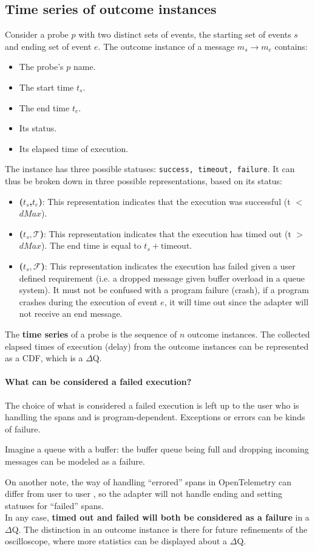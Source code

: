 \subsection{Time series of outcome instances}
    Consider a probe $p$ with two distinct sets of events, the starting set of events $s$ and ending set of event $e$. The outcome instance of a message $m_s \rightarrow m_e$ contains:
    \begin{itemize}
        \item The probe's $p$ name.
        \item The start time $t_s$.
        \item The end time $t_e$.
        \item Its status.
        \item Its elapsed time of execution.
    \end{itemize}
    The instance has three possible statuses: \texttt{success, timeout, failure}. It can thus be broken down in three possible representations, based on its status:
    \begin{itemize}
        \item \textbf{($t_s$,$t_e$)}: This representation indicates that the execution was successful (t $<$ $dMax$). 
        \item \textbf{($t_s, \mathcal{T}$)}: This representation indicates that the execution has timed out (t $>$ $dMax$). The end time is equal to $t_s + \text{timeout}$.
        \item \textbf{($t_s, \mathcal{F}$)}: This representation indicates the execution has failed given a user defined requirement (i.e. a dropped message given buffer overload in a queue system). It must not be confused with a program failure (crash), if a program crashes during the execution of event $e$, it will time out since the adapter will not receive an end message.
    \end{itemize}
    The \textbf{time series} of a probe is the sequence of $n$ outcome instances. The collected elapsed times of execution (delay) from the outcome instances can be represented as a CDF, which is a $\Delta$Q.

    \paragraph{What can be considered a failed execution?} The choice of what is considered a failed execution is left up to the user who is handling the spans and is program-dependent. Exceptions or errors can be kinds of failure.

    Imagine a queue with a buffer: the buffer queue being full and dropping incoming messages can be modeled as a failure.

    On another note, the way of handling ``errored'' spans in OpenTelemetry can differ from user to user  \cite{otel-err}, so the adapter will not handle ending and setting statuses for ``failed'' spans. \\
   In any case, \textbf{timed out and failed will both be considered as a failure} in a $\Delta$Q. The distinction in an outcome instance is there for future refinements of the oscilloscope, where more statistics can be displayed about a $\Delta$Q.
